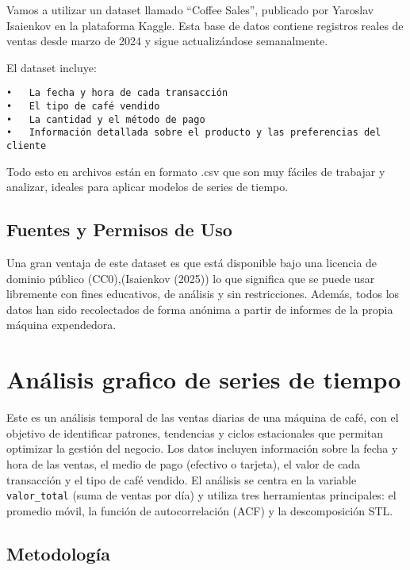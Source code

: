 \documentclass[
]{book}
\begin{document}
Vamos a utilizar un dataset llamado ``Coffee Sales'', publicado por
Yaroslav Isaienkov en la plataforma Kaggle. Esta base de datos contiene
registros reales de ventas desde marzo de 2024 y sigue actualizándose
semanalmente.

El dataset incluye:

\begin{verbatim}
•   La fecha y hora de cada transacción
•   El tipo de café vendido
•   La cantidad y el método de pago
•   Información detallada sobre el producto y las preferencias del cliente
\end{verbatim}

Todo esto en archivos están en formato .csv que son muy fáciles de
trabajar y analizar, ideales para aplicar modelos de series de tiempo.

\section{Fuentes y Permisos de Uso}\label{fuentes-y-permisos-de-uso}

Una gran ventaja de este dataset es que está disponible bajo una
licencia de dominio público (CC0),(Isaienkov (2025)) lo que significa
que se puede usar libremente con fines educativos, de análisis y sin
restricciones. Además, todos los datos han sido recolectados de forma
anónima a partir de informes de la propia máquina expendedora.

\chapter{Análisis grafico de series de
tiempo}\label{anuxe1lisis-grafico-de-series-de-tiempo}

Este es un análisis temporal de las ventas diarias de una máquina de
café, con el objetivo de identificar patrones, tendencias y ciclos
estacionales que permitan optimizar la gestión del negocio. Los datos
incluyen información sobre la fecha y hora de las ventas, el medio de
pago (efectivo o tarjeta), el valor de cada transacción y el tipo de
café vendido. El análisis se centra en la variable \texttt{valor\_total}
(suma de ventas por día) y utiliza tres herramientas principales: el
promedio móvil, la función de autocorrelación (ACF) y la descomposición
STL.

\section{Metodología}\label{metodologuxeda}
\end{document}

